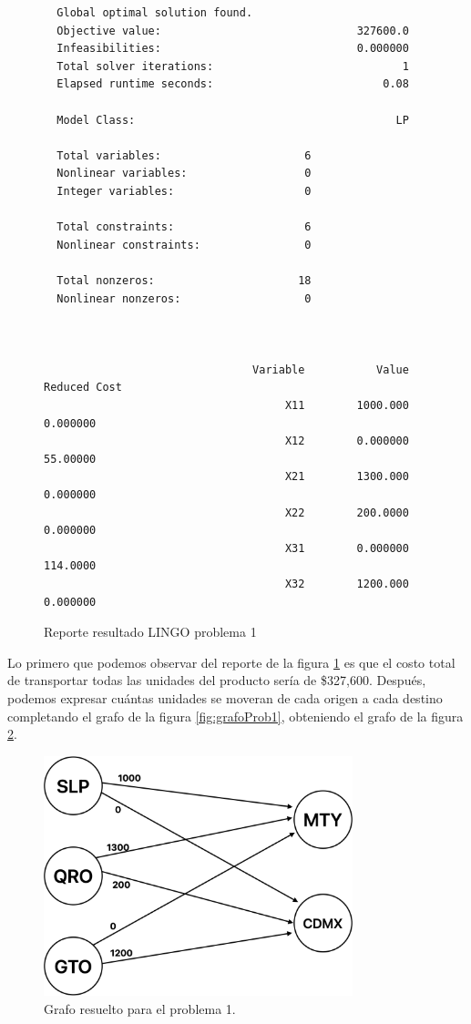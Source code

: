 \documentclass[12pt]{article}  %
\begin{document}
\begin{figure}[H]
	\centering
	\caption{Reporte resultado LINGO problema 1}
	\label{fig:reporteProb1}
	\begin{verbatim}
  Global optimal solution found.
  Objective value:                              327600.0
  Infeasibilities:                              0.000000
  Total solver iterations:                             1
  Elapsed runtime seconds:                          0.08

  Model Class:                                        LP

  Total variables:                      6
  Nonlinear variables:                  0
  Integer variables:                    0

  Total constraints:                    6
  Nonlinear constraints:                0

  Total nonzeros:                      18
  Nonlinear nonzeros:                   0



                                Variable           Value        Reduced Cost
                                     X11        1000.000            0.000000
                                     X12        0.000000            55.00000
                                     X21        1300.000            0.000000
                                     X22        200.0000            0.000000
                                     X31        0.000000            114.0000
                                     X32        1200.000            0.000000

	\end{verbatim}
\end{figure}

Lo primero que podemos observar del reporte de la figura \ref{fig:reporteProb1} es que el costo total de transportar todas las unidades del producto sería de \$327,600. Después, podemos expresar cuántas unidades se moveran de cada origen a cada destino completando el grafo de la figura \ref{fig:grafoProb1}, obteniendo el grafo de la figura \ref{fig:grafoResProb1}.

\begin{figure}[H]
\centering
\caption{Grafo resuelto para el problema 1.}
\label{fig:grafoResProb1}
\includegraphics[width=0.8\textwidth]{grafoProb1Res.png}
\end{figure}
\end{document}
